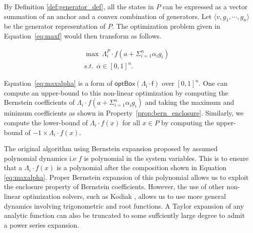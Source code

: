 By Definition \ref{def:generator_def}, all the states in $P$ can be expressed as a vector summation of an anchor and a convex combination of generators.
%
Let  $\langle v, g_1, \cdots, g_n \rangle$ be the generator representation of $P$.
%
The optimization problem given in Equation~\ref{eq:maxf} would then transform as follows.

\begin{eqnarray}
  \max ~ \Lambda_i^P \cdot f(a + \Sigma_{i=1}^{n} \alpha_i g_i) \label{eq:maxalpha}\\
  s.t. ~~ \overline\alpha \in [0,1]^{n}.\nonumber
\end{eqnarray}

Equation~\ref{eq:maxalpha} is a form of $\mathsf{optBox(\Lambda_{i} \cdot f)}$ over $[0,1]^n$.
%
One can compute an upper-bound to this non-linear optimization by computing the Bernstein coefficients of $\Lambda_i \cdot f(a + \Sigma_{i=1}^{n} \alpha_i g_i)$ and taking the maximum and minimum coefficients as shown in Property~\ref{prop:bern_enclosure}.
%
Similarly, we compute the lower-bound of $\Lambda_{i}\cdot f(x)$ for all $x \in P$ by computing the upper-bound of $-1 \times \Lambda_{i}\cdot f(x)$.
%
\begin{remark}
The original algorithm using Bernstein expansion proposed by \cite{dreossi2016parallelotope} assumed polynomial dynamics i.e $f$ is polynomial in the system variables.
%
This is to ensure that a $\Lambda_{i}\cdot f(x)$ is a polynomial after the composition shown in Equation \ref{eq:maxalpha}. Proper Bernstein expansion of this polynomial allows us to exploit the enclosure property of Bernstein coefficients. However, the use of other non-linear optimization solvers, such as Kodiak \cite{kodiak}, allows us to use more general dynamics involving trigonometric and root functions. A Taylor expansion of any analytic function can also be truncated to some suffciently large degree to admit a power series expansion.
\end{remark}

